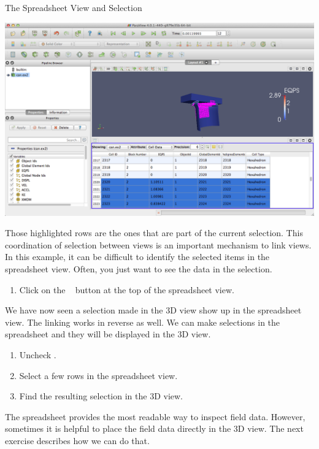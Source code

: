 \begin{exercise}{The Spreadsheet View and Selection}
  \begin{inlinefig}
    \includegraphics[width=\scw]{images/SpreadsheetViewExample}
  \end{inlinefig}

  Those highlighted rows are the ones that are part of the current
  selection.  This coordination of selection between views is an important
  mechanism to link views.  In this example, it can be difficult to identify
  the selected items in the spreadsheet view.  Often, you just want to see
  the data in the selection.

  \begin{enumerate}
    \restorecounter
  \item Click on the ~
    button at the top of the spreadsheet view.
    \savecounter
  \end{enumerate}

  We have now seen a selection made in the 3D view show up in the
  spreadsheet view.  The linking works in reverse as well.  We can make
  selections in the spreadsheet and they will be displayed in the 3D view.

  \begin{enumerate}
  \item Uncheck .
  \item Select a few rows in the spreadsheet view.
  \item Find the resulting selection in the 3D view.
  \end{enumerate}
\end{exercise}

The spreadsheet provides the most readable way to inspect field data.
However, sometimes it is helpful to place the field data directly in the 3D
view.  The next exercise describes how we can do that.

